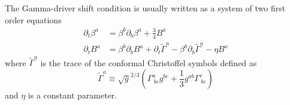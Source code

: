 The Gamma-driver shift condition is usually written as a system of two first order equations
\begin{subequations}\label{Gamma-driver shift set}
\begin{align}
\partial_{t}\beta^{a} & = \beta^{b}\partial_{b}\beta^{a} + \frac{3}{4}B^{a}\\
\partial_{t}B^{a} & = \beta^{b}\partial_{b}B^{a} + \partial_{t}{\tilde \Gamma}^{a} - \beta^{b}\partial_{b}{\tilde \Gamma}^{a} - \eta B^{a}
\end{align}
\end{subequations}
where ${\tilde \Gamma}^{a}$ is the trace of the conformal Christoffel symbols defined as
\begin{equation}
{\tilde \Gamma}^{a} \equiv \sqrt{g}^{2/3}\left(\Gamma^{a}_{~bc}g^{bc} + \frac{1}{3}g^{ab}\Gamma^{c}_{~bc}\right)
\end{equation}
and $\eta$ is a constant parameter. 

